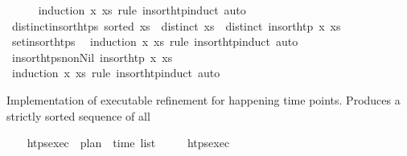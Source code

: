 \begin{isabellebody}
%
\isadelimproof
\ \ \ \ %
\endisadelimproof
%
\isatagproof
{}\isamarkupfalse%
\ {\isacharparenleft}{\kern0pt}induction\ x\ xs\ rule{\isacharcolon}{\kern0pt}\ insort{\isacharunderscore}{\kern0pt}htp{\isachardot}{\kern0pt}induct{\isacharparenright}{\kern0pt}\ auto%
\endisatagproof
{\isafoldproof}%
%
\isadelimproof
\isanewline
%
\endisadelimproof
\isanewline
\ \ \isamarkupfalse%
\ distinct{\isacharunderscore}{\kern0pt}insort{\isacharunderscore}{\kern0pt}htps{\isacharcolon}{\kern0pt}\ {\isachardoublequoteopen}sorted\ xs\ {\isasymLongrightarrow}\ distinct\ xs\ {\isasymLongrightarrow}\ distinct\ {\isacharparenleft}{\kern0pt}insort{\isacharunderscore}{\kern0pt}htp\ x\ xs{\isacharparenright}{\kern0pt}{\isachardoublequoteclose}\isanewline
%
\isadelimproof
\ \ \ \ %
\endisadelimproof
%
\isatagproof
{}\isamarkupfalse%
\ set{\isacharunderscore}{\kern0pt}insort{\isacharunderscore}{\kern0pt}htps\ \isamarkupfalse%
\ {\isacharparenleft}{\kern0pt}induction\ x\ xs\ rule{\isacharcolon}{\kern0pt}\ insort{\isacharunderscore}{\kern0pt}htp{\isachardot}{\kern0pt}induct{\isacharparenright}{\kern0pt}\ auto%
\endisatagproof
{\isafoldproof}%
%
\isadelimproof
\isanewline
%
\endisadelimproof
\isanewline
\ \ \isamarkupfalse%
\ insort{\isacharunderscore}{\kern0pt}htps{\isacharunderscore}{\kern0pt}non{\isacharunderscore}{\kern0pt}Nil{\isacharcolon}{\kern0pt}\ {\isachardoublequoteopen}insort{\isacharunderscore}{\kern0pt}htp\ x\ xs\ {\isasymnoteq}\ {\isacharbrackleft}{\kern0pt}{\isacharbrackright}{\kern0pt}{\isachardoublequoteclose}\isanewline
%
\isadelimproof
\ \ \ \ %
\endisadelimproof
%
\isatagproof
{}\isamarkupfalse%
\ {\isacharparenleft}{\kern0pt}induction\ x\ xs\ rule{\isacharcolon}{\kern0pt}\ insort{\isacharunderscore}{\kern0pt}htp{\isachardot}{\kern0pt}induct{\isacharparenright}{\kern0pt}\ auto%
\endisatagproof
{\isafoldproof}%
%
\isadelimproof
%
\endisadelimproof
%
\begin{isamarkuptext}%
Implementation of executable refinement for happening time points. Produces a 
  strictly sorted sequence of all %
\end{isamarkuptext}\isamarkuptrue%
\ \ \isamarkupfalse%
\ htps{\isacharunderscore}{\kern0pt}exec\ {\isacharcolon}{\kern0pt}{\isacharcolon}{\kern0pt}\ {\isachardoublequoteopen}plan\ {\isasymRightarrow}\ time\ list{\isachardoublequoteclose}\ \isanewline
\ \ \ \ {\isachardoublequoteopen}htps{\isacharunderscore}{\kern0pt}exec\ {\isacharbrackleft}{\kern0pt}{\isacharbrackright}{\kern0pt}\ {\isacharequal}{\kern0pt}\ {\isacharbrackleft}{\kern0pt}{\isacharbrackright}{\kern0pt}{\isachardoublequoteclose}\ \isanewline

\end{isabellebody}
